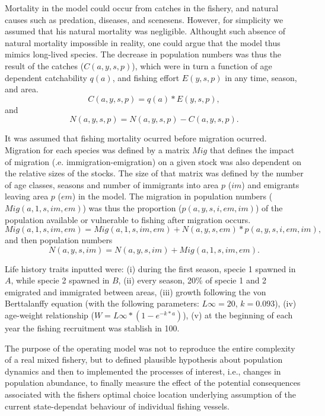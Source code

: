 \documentclass[12pt,oneline,a4paper,numbib]{ouparticle}
\numberwithin{equation}{subsection} %
\begin{document}
Mortality in the model could occur from catches in the fishery, and natural causes such as predation, diseases, and scenesens. However, for simplicity we assumed that his natural mortality was negligible. Althought such absence of natural mortality impossible in reality, one could argue that the model thus mimics long-lived species. The decrease in population numbers was thus the result of the catches ($C (a, y, s, p)$), which were in turn a function of age dependent catchability $q(a)$, and fishing effort $E (y,s,p)$ in any time, season, and area. 
\begin{equation}
C (a, y, s, p) = q(a) * E(y,s,p),
\end{equation}
and 
\begin{equation}
N (a, y, s, p) = N (a, y, s, p) - C (a, y, s, p). 
\end{equation}

It was assumed that fishing mortality ocurred before migration ocurred. Migration for each species was defined by a matrix $Mig$ that defines the impact of migration (.e. immigration-emigration) on a given stock was also dependent on the relative sizes of the stocks. The size of that matrix  was defined by the number of age classes, seasons and number of immigrants into area $p$ ($im$) and emigrants leaving area $p$ ($em$) in the model. The migration in population numbers ($Mig (a, 1, s, im, em)$) was thus the proportion ($p (a, y, s, i, em, im)$) of the population available or vulnerable to fishing after migration occurs.   
\begin{equation}
Mig (a, 1, s, im, em) = Mig(a, 1, s, im, em) + N (a, y, s, em) * p (a, y, s, i, em, im),
\end{equation}
and then population numbers
\begin{equation}
N (a, y, s, im) = N (a, y, s, im) +  Mig (a, 1, s, im, em).
\end{equation}

Life history traits inputted were: (i)  during the first season, specie 1 spawned in $A$, while specie 2 spawned in $B$, (ii) every season, 20\% of specie 1 and 2 emigrated and immigrated between areas, (iii) growth following the von Berttalanffy equation (with the following parameters: $L\infty= 20$, $k= 0.093$), (iv) age-weight relationship ($W= L\infty*(1-e^{-k*a})$), (v) at the beginning of each year the fishing recruitment was stablish in 100.

The purpose of the operating model was not to reproduce the entire complexity of a real mixed fishery, but to defined plausible hypothesis about population dynamics and then to implemented the processes of interest, i.e., changes in population abundance, to finally measure the effect of the potential consequences associated with the fishers optimal choice location underlying assumption of the current state-dependat behaviour of individual fishing vessels.
\end{document}
